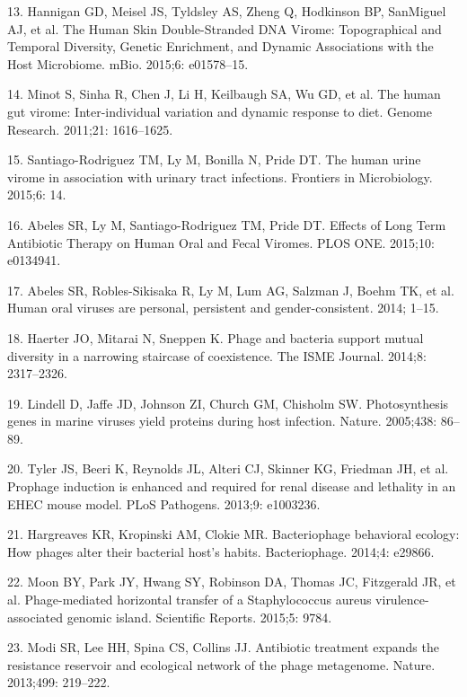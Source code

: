 \documentclass[12pt,]{article}
\begin{document}
\hypertarget{ref-Hannigan:2015fz}{}
13. Hannigan GD, Meisel JS, Tyldsley AS, Zheng Q, Hodkinson BP,
SanMiguel AJ, et al. The Human Skin Double-Stranded DNA Virome:
Topographical and Temporal Diversity, Genetic Enrichment, and Dynamic
Associations with the Host Microbiome. mBio. 2015;6: e01578--15.

\hypertarget{ref-Minot:2011ez}{}
14. Minot S, Sinha R, Chen J, Li H, Keilbaugh SA, Wu GD, et al. The
human gut virome: Inter-individual variation and dynamic response to
diet. Genome Research. 2011;21: 1616--1625.

\hypertarget{ref-SantiagoRodriguez:2015gd}{}
15. Santiago-Rodriguez TM, Ly M, Bonilla N, Pride DT. The human urine
virome in association with urinary tract infections. Frontiers in
Microbiology. 2015;6: 14.

\hypertarget{ref-Abeles:2015dy}{}
16. Abeles SR, Ly M, Santiago-Rodriguez TM, Pride DT. Effects of Long
Term Antibiotic Therapy on Human Oral and Fecal Viromes. PLOS ONE.
2015;10: e0134941.

\hypertarget{ref-Abeles:2014kj}{}
17. Abeles SR, Robles-Sikisaka R, Ly M, Lum AG, Salzman J, Boehm TK, et
al. Human oral viruses are personal, persistent and gender-consistent.
2014; 1--15.

\hypertarget{ref-Haerter:2014ii}{}
18. Haerter JO, Mitarai N, Sneppen K. Phage and bacteria support mutual
diversity in a narrowing staircase of coexistence. The ISME Journal.
2014;8: 2317--2326.

\hypertarget{ref-Lindell:2005gz}{}
19. Lindell D, Jaffe JD, Johnson ZI, Church GM, Chisholm SW.
Photosynthesis genes in marine viruses yield proteins during host
infection. Nature. 2005;438: 86--89.

\hypertarget{ref-Tyler:2013fl}{}
20. Tyler JS, Beeri K, Reynolds JL, Alteri CJ, Skinner KG, Friedman JH,
et al. Prophage induction is enhanced and required for renal disease and
lethality in an EHEC mouse model. PLoS Pathogens. 2013;9: e1003236.

\hypertarget{ref-Hargreaves:2014ja}{}
21. Hargreaves KR, Kropinski AM, Clokie MR. Bacteriophage behavioral
ecology: How phages alter their bacterial host's habits. Bacteriophage.
2014;4: e29866.

\hypertarget{ref-Moon:2015fa}{}
22. Moon BY, Park JY, Hwang SY, Robinson DA, Thomas JC, Fitzgerald JR,
et al. Phage-mediated horizontal transfer of a Staphylococcus aureus
virulence-associated genomic island. Scientific Reports. 2015;5: 9784.

\hypertarget{ref-Modi:2013fi}{}
23. Modi SR, Lee HH, Spina CS, Collins JJ. Antibiotic treatment expands
the resistance reservoir and ecological network of the phage metagenome.
Nature. 2013;499: 219--222.
\end{document}
